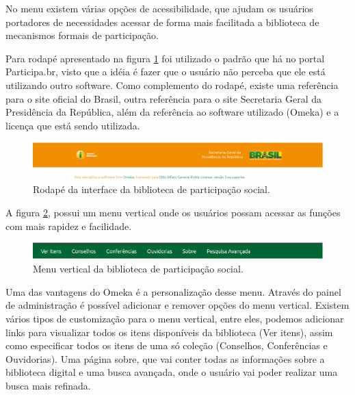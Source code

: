 No menu existem várias opções de acessibilidade, que ajudam os usuários portadores de necessidades acessar de forma mais facilitada a biblioteca de mecanismos formais de participação.

Para rodapé apresentado na figura \ref{fig:rodape_prototipo} foi utilizado o padrão que há no portal Participa.br, visto que a idéia é fazer que o usuário não perceba que ele está utilizando outro software. Como complemento do rodapé, existe uma referência para o site oficial do Brasil, outra referência para o site Secretaria Geral da Presidência da República, além da referência ao software utilizado (Omeka) e a licença que está sendo utilizada.

\graphicspath{{figuras/prototipo/}}
\begin{figure}[H]
\centering
\includegraphics[width=1.0\textwidth]{rodape}
\caption{Rodapé da interface da biblioteca de participação social.}
\label{fig:rodape_prototipo}
\end{figure}

A figura \ref{fig:vertical_prototipo}, possui um menu vertical onde os usuários possam acessar as funções com mais rapidez e facilidade.

\graphicspath{{figuras/prototipo/}}
\begin{figure}[H]
\centering
\includegraphics[width=1.0\textwidth]{barra-superior}
\caption{Menu vertical da biblioteca de participação social.}
\label{fig:vertical_prototipo}
\end{figure}

Uma das vantagens do Omeka é a personalização desse menu. Através do painel de administração é possível adicionar e remover opções do menu vertical. Existem vários tipos de customização para o menu vertical, entre eles, podemos adicionar links para visualizar todos os itens disponíveis da biblioteca (Ver itens), assim como especificar todos os itens de uma só coleção (Conselhos, Conferências e Ouvidorias). Uma página sobre, que vai conter todas as informações sobre a biblioteca digital e uma busca avançada, onde o usuário vai poder realizar uma busca mais refinada.

